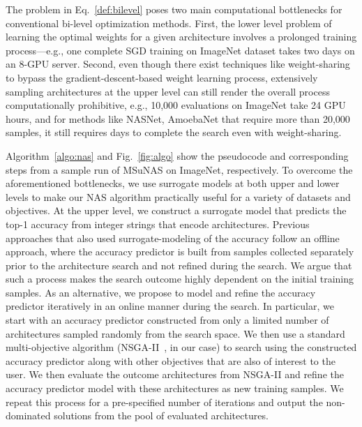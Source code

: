 \documentclass[runningheads]{llncs}
\def\ourmethod{MSuNAS}
\begin{document}
The problem in Eq.~\ref{def:bilevel} poses two main computational bottlenecks for conventional bi-level optimization methods. First, the lower level problem of learning the optimal weights  for a given architecture  involves a prolonged training process---e.g., one complete SGD training on ImageNet dataset takes two days on an 8-GPU server. Second, even though there exist techniques like weight-sharing to bypass the gradient-descent-based weight learning process, extensively sampling architectures at the upper level can still render the overall process computationally prohibitive, e.g., 10,000 evaluations on ImageNet take 24 GPU hours, and for methods like NASNet, AmoebaNet that require more than 20,000 samples, it still requires days to complete the search even with weight-sharing.

Algorithm~\ref{algo:nas} and Fig.~\ref{fig:algo} show the pseudocode and corresponding steps from a sample run of \ourmethod{} on ImageNet, respectively. To overcome the aforementioned bottlenecks, we use surrogate models at both upper and lower levels to make our NAS algorithm practically useful for a variety of datasets and objectives. At the upper level, we construct a surrogate model that predicts the top-1 accuracy from integer strings that encode architectures. Previous approaches \cite{chamnet,ae-cnn+e2epp,onceforall} that also used surrogate-modeling of the accuracy follow an offline approach, where the accuracy predictor is built from samples collected separately prior to the architecture search and not refined during the search. We argue that such a process makes the search outcome highly dependent on the initial training samples. As an alternative, we propose to model and refine the accuracy predictor iteratively in an online manner during the search. In particular, we start with an accuracy predictor constructed from only a limited number of architectures sampled randomly from the search space. We then use a standard multi-objective algorithm (NSGA-II~\cite{nsga2}, in our case) to search using the constructed accuracy predictor along with other objectives that are also of interest to the user. We then evaluate the outcome architectures from NSGA-II and refine the accuracy predictor model with these architectures as new training samples. We repeat this process for a pre-specified number of iterations and output the non-dominated solutions from the pool of evaluated architectures.
\end{document}
